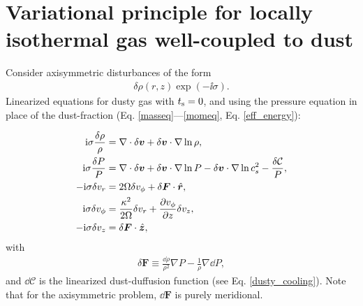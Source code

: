 \section{Variational principle for locally isothermal gas
  well-coupled to dust}\label{var_prin}

Consider axisymmetric disturbances of the form
\begin{align}
  \delta\rho(r,z)\exp{\left(-\ii\sigma\right)}. 
\end{align}
Linearized equations for dusty gas with $t_\mathrm{s}=0$, and using the
pressure equation in place of the dust-fraction
(Eq. \ref{masseq}---\ref{momeq}, Eq. \ref{eff_energy}): 

\begin{align}
  \mathrm{i}\sigma\frac{\delta\rho}{\rho} &= \nabla\cdot\delta\bm{v} +
  \delta\bm{v}\cdot\nabla\ln{\rho},\\
  \mathrm{i}\sigma\frac{\delta P}{P} &= \nabla\cdot\delta\bm{v} +
  \delta\bm{v}\cdot\nabla\ln{P} - \delta\bm{v}\cdot\nabla\ln{c_s^2} - \frac{\delta\mathcal{C}}{P},\\
  -\mathrm{i}\sigma\delta v_r  &= 2\Omega\delta v_\phi + 
  \delta\bm{F}\cdot\hat{\bm{r}},\\
  \mathrm{i}\sigma\delta v_\phi &= \frac{\kappa^2}{2\Omega}\delta v_r + \frac{\partial
    v_\phi}{\partial z}\delta v_z,\\
  -\mathrm{i}\sigma\delta v_z &=  \delta\bm{F}\cdot\hat{\bm{z}},
\end{align} 
with
\begin{align}
  \delta \bm{F} \equiv \frac{\dd\rho}{\rho^2}\nabla P -
  \frac{1}{\rho}\nabla\dd P, 
\end{align}
and $\dd\mathcal{C}$ is the linearized dust-duffusion function (see Eq. \ref{dusty_cooling}).  
Note that for the axisymmetric problem, $\dd\bm{F}$ is purely
meridional. 

